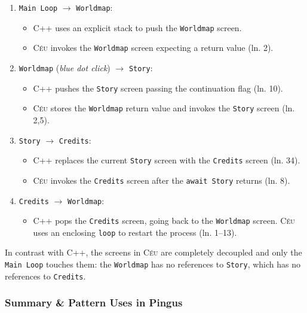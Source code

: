 \documentclass{vgtc}                          %
\newcommand{\CEU}{\textsc{C\'{e}u}\xspace}
\newcommand{\code}[1] {{\small{\texttt{#1}}}}
\begin{document}
\begin{enumerate}
\item \code{Main Loop} $\longrightarrow$ \code{Worldmap}:
    \begin{itemize}
    \item C++ uses an explicit stack to push the \code{Worldmap} screen.
    \item \CEU invokes the \code{Worldmap} screen expecting a return value
          (ln. 2).
    \end{itemize}
\item \code{Worldmap} (\emph{blue dot click}) $\longrightarrow$ \code{Story}:
    \begin{itemize}
    \item C++ pushes the \code{Story} screen passing the continuation flag
          (ln. 10).
    \item \CEU stores the \code{Worldmap} return value and invokes the \code{Story} screen
          (ln. 2,5).
    \end{itemize}
\item \code{Story} $\longrightarrow$ \code{Credits}:
    \begin{itemize}
    \item C++ replaces the current \code{Story} screen with the \code{Credits}
          screen (ln. 34).
    \item \CEU invokes the \code{Credits} screen after the \code{await Story}
          returns (ln. 8).
    \end{itemize}
\item \code{Credits} $\longrightarrow$ \code{Worldmap}:
    \begin{itemize}
    \item C++ pops the \code{Credits} screen, going back to the \code{Worldmap}
          screen.
          \CEU uses an enclosing \code{loop} to restart the process (ln. 1--13).
    \end{itemize}
\end{enumerate}

In contrast with C++, the screens in \CEU are completely decoupled and only the
\code{Main Loop} touches them: the \code{Worldmap} has no references to
\code{Story}, which has no references to \code{Credits}.

\subsubsection{Summary \& Pattern Uses in Pingus}
\end{document}
